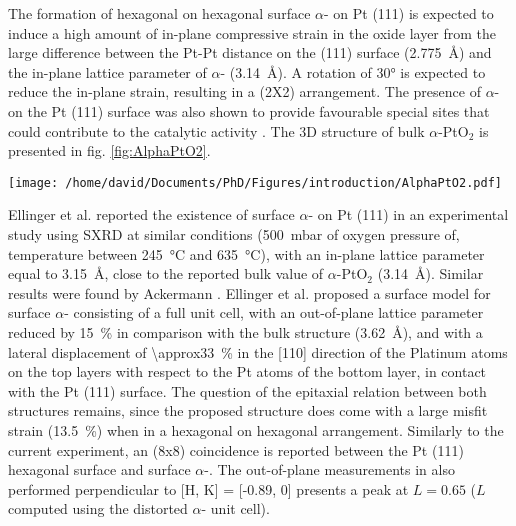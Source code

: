 The formation of hexagonal on hexagonal surface $\alpha$- on Pt (111) is expected to induce a high amount of in-plane compressive strain in the oxide layer from the large difference between the Pt-Pt distance on the (111) surface (\qty{2.775}{\angstrom}) and the in-plane lattice parameter of $\alpha$- (\qty{3.14}{\angstrom}).
A rotation of \ang{30} is expected to reduce the in-plane strain, resulting in a (2X2) arrangement.
The presence of $\alpha$- on the Pt (111) surface was also shown to provide favourable special sites that could contribute to the catalytic activity \parencite{Li2005}.
The 3D structure of bulk $\alpha$-PtO$_2$ is presented in fig. \ref{fig:AlphaPtO2}.

\begin{SCfigure}
    \centering
    \texttt{[image: /home/david/Documents/PhD/Figures/introduction/AlphaPtO2.pdf]}
    \caption{
        $\alpha$- bulk unit cell.
        Platinum atoms are situated on the unit cell corners while the two oxygen atoms are at the positions $(1/3, 2/3, 1/4)$ and $(2/3, 1/3, 3/4)$.
    }
    \label{fig:AlphaPtO2}
\end{SCfigure}

Ellinger et al. \parencite*{Ellinger2008} reported the existence of surface $\alpha$- on Pt (111) in an experimental study using SXRD at similar conditions (\qty{500}{\milli\bar} of oxygen pressure of, temperature between \qty{245}{\degreeCelsius} and \qty{635}{\degreeCelsius}), with an in-plane lattice parameter equal to \qty{3.15}{\angstrom}, close to the reported bulk value of $\alpha$-PtO$_2$ (\qty{3.14}{\angstrom}).
Similar results were found by Ackermann \parencite*{Ackermann2007}.
Ellinger et al. \parencite*{Ellinger2008} proposed a surface model for surface $\alpha$- consisting of a full unit cell, with an out-of-plane lattice parameter reduced by \qty{15}{\percent} in comparison with the bulk structure (\qty{3.62}{\angstrom}), and with a lateral displacement of \qty{\approx33}{\percent} in the [110] direction of the Platinum atoms on the top layers with respect to the Pt atoms of the bottom layer, in contact with the Pt (111) surface.
The question of the epitaxial relation between both structures remains, since the proposed structure does come with a large misfit strain (\qty{13.5}{\percent}) when in a hexagonal on hexagonal arrangement.
Similarly to the current experiment, an (8x8) coincidence is reported between the Pt (111) hexagonal surface and surface $\alpha$-.
The out-of-plane measurements in \cite{Ellinger2008} also performed perpendicular to [H, K] = [-0.89, 0] presents a peak at $L=0.65$ ($L$ computed using the distorted $\alpha$- unit cell).

